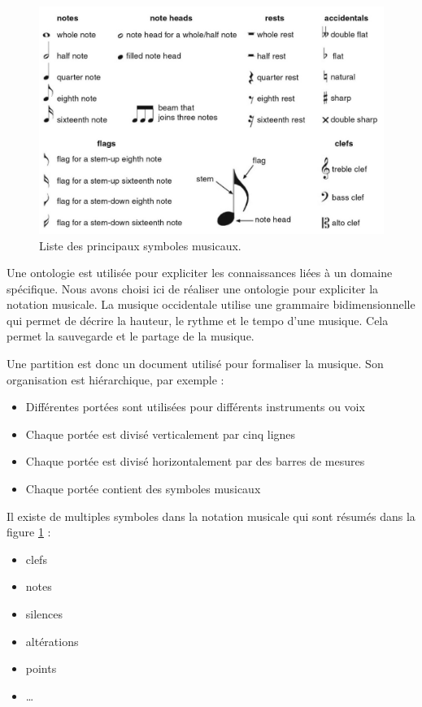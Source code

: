 \documentclass[paper=a4, fontsize=11pt]{scrartcl} %
\numberwithin{equation}{section} %
\numberwithin{figure}{section} %
\numberwithin{table}{section} %
\begin{document}
\begin{figure}[btp]
  \centering
  \includegraphics[scale=1]{list_symbols}
  \caption{\label{list_symbols} Liste des principaux symboles musicaux. }
\end{figure}

Une ontologie est utilisée pour expliciter les connaissances liées à un domaine spécifique.
Nous avons choisi ici de réaliser une ontologie pour expliciter la notation musicale.
La musique occidentale utilise une grammaire bidimensionnelle qui permet de décrire la hauteur, le rythme et le tempo d'une musique.
Cela permet la sauvegarde et le partage de la musique.

Une partition est donc un document utilisé pour formaliser la musique.
Son organisation est hiérarchique, par exemple :
\begin{itemize}
  \item Différentes portées sont utilisées pour différents instruments ou voix
  \item Chaque portée est divisé verticalement par cinq lignes
  \item Chaque portée est divisé horizontalement par des barres de mesures
  \item Chaque portée contient des symboles musicaux
\end{itemize}
Il existe de multiples symboles dans la notation musicale qui sont résumés dans la figure \ref{list_symbols} :
\begin{itemize}
  \item clefs
  \item notes
  \item silences
  \item altérations
  \item points
  \item \ldots
\end{itemize}
\end{document}
